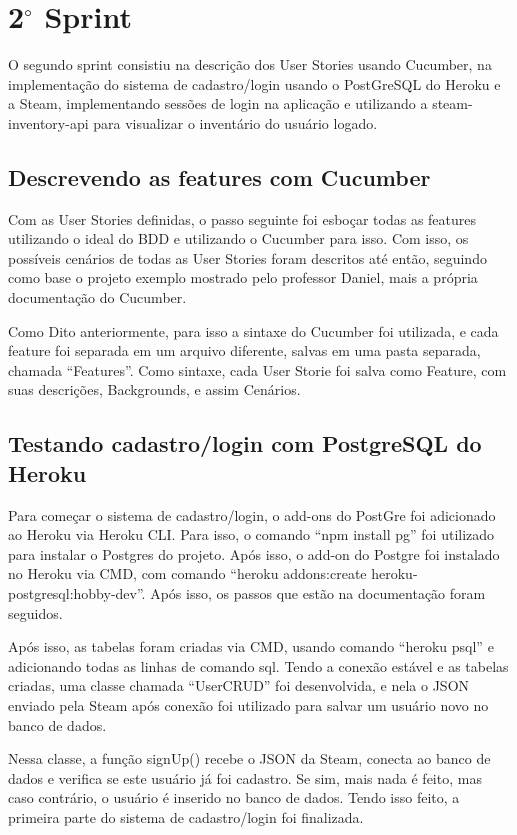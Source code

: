 \section{2$^{\circ}$ Sprint}
O segundo sprint consistiu na descrição dos User Stories usando Cucumber, na implementação do sistema de cadastro/login usando o PostGreSQL do Heroku e a Steam, implementando sessões de login na aplicação e utilizando a steam-inventory-api para visualizar o inventário do usuário logado.

\subsection{Descrevendo as features com Cucumber}
Com as User Stories definidas, o passo seguinte foi esboçar todas as features utilizando o ideal do BDD 
e utilizando o Cucumber para isso. Com isso, os possíveis cenários de todas as User Stories foram descritos até então, seguindo como base o projeto exemplo mostrado pelo professor Daniel, 
mais a própria documentação do Cucumber.

Como Dito anteriormente, para isso a sintaxe do Cucumber foi utilizada, e cada feature foi separada em um arquivo diferente, 
salvas em uma pasta separada, chamada ``Features''. 
Como sintaxe, cada User Storie foi salva como Feature, com suas descrições, Backgrounds, e assim Cenários.

\subsection{Testando cadastro/login com PostgreSQL do Heroku}
Para começar o sistema de cadastro/login, o add-ons do PostGre foi adicionado ao Heroku via Heroku CLI. Para isso, 
o comando ``npm install pg'' foi utilizado para instalar o Postgres do projeto. Após isso, o add-on do Postgre foi instalado no
Heroku via CMD, com comando ``heroku addons:create heroku-postgresql:hobby-dev''. Após isso, os passos 
que estão na documentação  foram seguidos.

Após isso, as tabelas foram criadas via CMD, usando comando ``heroku psql'' e adicionando todas as linhas de comando sql.
Tendo a conexão estável e as tabelas criadas, uma classe chamada ``UserCRUD'' foi desenvolvida, e nela o JSON 
enviado pela Steam após conexão foi utilizado para salvar um usuário novo no banco de dados.

Nessa classe, a função signUp() recebe o JSON da Steam, conecta ao banco de dados e verifica se este usuário 
já foi cadastro. Se sim, mais nada é feito, mas caso contrário, o usuário é inserido no banco de dados.
Tendo isso feito, a primeira parte do sistema de cadastro/login foi finalizada.

